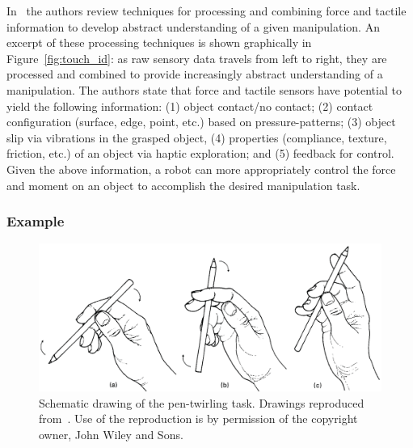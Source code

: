 In~\cite{cutkosky2008force} the authors review techniques for processing and combining force and tactile information to develop abstract understanding of a given manipulation.
An excerpt of these processing techniques is shown graphically in Figure~\ref{fig:touch_id}: as raw sensory data travels from left to right, they are processed and combined to provide increasingly abstract understanding of a manipulation.
The authors state that force and tactile sensors have potential to yield the following information:
(1) object contact/no contact; 
(2) contact configuration (surface, edge, point, etc.) based on pressure-patterns; 
(3) object slip via vibrations in the grasped object, 
(4) properties (compliance, texture, friction, etc.) of an object via haptic exploration; and 
(5) feedback for control.
Given the above information, a robot can more appropriately control the force and moment on an object to accomplish the desired manipulation task.


\subsubsection*{Example}

\begin{figure}[]
	\centering
	\includegraphics[width=\linewidth]{images/pen_twirling}
	\caption{Schematic drawing of the pen-twirling task. Drawings reproduced from~\cite{elliott1984classification}. Use of the reproduction is by permission of the copyright owner, John Wiley and Sons.}
	\label{fig:pen_twirling}
\end{figure}

